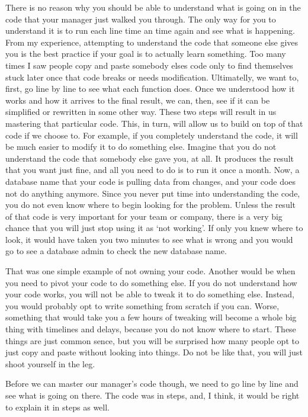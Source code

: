 \documentclass[]{book}
\begin{document}
There is no reason why you should be able to understand what is going on in the code that your manager just walked you through. The only way for you to understand it is to run each line time an time again and see what is happening. From my experience, attempting to understand the code that someone else gives you is the best practice if your goal is to actually learn something. Too many times I saw people copy and paste somebody elses code only to find themselves stuck later once that code breaks or needs modification. Ultimatelly, we want to, first, go line by line to see what each function does. Once we understood how it works and how it arrives to the final result, we can, then, see if it can be simplified or rewritten in some other way. These two steps will result in us mastering that particular code. This, in turn, will allow us to build on top of that code if we choose to. For example, if you completely understand the code, it will be much easier to modify it to do something else. Imagine that you do not understand the code that somebody else gave you, at all. It produces the result that you want just fine, and all you need to do is to run it once a month. Now, a database name that your code is pulling data from changes, and your code does not do anything anymore. Since you never put time into understanding the code, you do not even know where to begin looking for the problem. Unless the result of that code is very important for your team or company, there is a very big chance that you will just stop using it as `not working'. If only you knew where to look, it would have taken you two minutes to see what is wrong and you would go to see a database admin to check the new database name.

That was one simple example of not owning your code. Another would be when you need to pivot your code to do something else. If you do not understand how your code works, you will not be able to tweak it to do something else. Instead, you would probably opt to write something from scratch if you can. Worse, something that would take you a few hours of tweaking will become a whole big thing with timelines and delays, because you do not know where to start. These things are just common sence, but you will be surprised how many people opt to just copy and paste without looking into things. Do not be like that, you will just shoot yourself in the leg.

Before we can master our manager's code though, we need to go line by line and see what is going on there. The code was in steps, and, I think, it would be right to explain it in steps as well.
\end{document}
